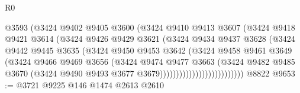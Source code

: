 \begin{lexlean}{R0}
\begin{coremodule}
                                @3593
                                (@3424
                                  @9402
                                  @9405
                                  @3600
                                  (@3424
                                    @9410
                                    @9413
                                    @3607
                                    (@3424
                                      @9418
                                      @9421
                                      @3614
                                      (@3424
                                        @9426
                                        @9429
                                        @3621
                                        (@3424
                                          @9434
                                          @9437
                                          @3628
                                          (@3424
                                            @9442
                                            @9445
                                            @3635
                                            (@3424
                                              @9450
                                              @9453
                                              @3642
                                              (@3424
                                                @9458
                                                @9461
                                                @3649
                                                (@3424
                                                  @9466
                                                  @9469
                                                  @3656
                                                  (@3424
                                                    @9474
                                                    @9477
                                                    @3663
                                                    (@3424
                                                      @9482
                                                      @9485
                                                      @3670
                                                      (@3424
                                                        @9490
                                                        @9493
                                                        @3677
                                                        @3679))))))))))))))))))))))))))
    @8822
@9653 := @3721 @9225 @146 @1474 @2613 @2610

\end{coremodule}
\end{lexlean}
